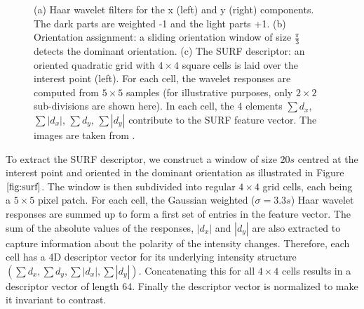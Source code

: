 \documentclass{SMBV12}
\begin{document}
\begin{figure}[htbp]
    \centering
    \caption{(a) Haar wavelet filters for the x (left) and y (right) components. The dark parts are weighted -1 and the light parts +1. (b) Orientation assignment: a sliding orientation window of size $\frac{\pi}{3}$ detects the dominant orientation. (c) The SURF descriptor: an oriented quadratic grid with $4 \times 4$ square cells is laid over the interest point (left). For each cell, the wavelet responses are computed from $5 \times 5$ samples (for illustrative purposes, only $2 \times 2$ sub-divisions are shown here). In each cell, the 4 elements $\sum d_x$, $\sum \left| d_x \right|$, $\sum d_y$, $\sum \left| d_y \right| $ contribute to the SURF feature vector. The images are taken from \cite{bay2006surf}.} 
\end{figure}

To extract the SURF descriptor, we construct a window of size $20s$ centred at the interest point and oriented in the dominant orientation as illustrated in Figure $\ref{fig:surf}$. The window is then subdivided into regular $4 \times 4$ grid cells, each being a $5 \times 5$ pixel patch. For each cell, the Gaussian weighted ($\sigma = 3.3s$) Haar wavelet responses are summed up to form a first set of entries in the feature vector. The sum of the absolute values of the responses, $\left| d_x \right| $ and $\left| d_y \right| $ are also extracted to capture information about the polarity of the intensity changes. Therefore, each cell has a 4D descriptor vector for its underlying intensity structure $\left( \sum d_x, \sum d_y, \sum \left| d_x \right| , \sum \left| d_y \right|  \right)$. Concatenating this for all $4 \times 4$ cells results in a descriptor vector of length 64. Finally the descriptor vector is normalized to make it invariant to contrast.
\end{document}
